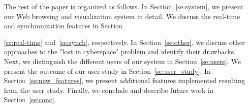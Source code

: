 \documentclass[10pt,psfig]{article}
\begin{document}
The rest of the paper is organized as follows.
In Section~\ref{se:system}, we present our Web browsing and visualization system in detail.
We discuss the real-time and synchronization features in Section~{\ref{se:real-time} and~\ref{se:synch}, respectively.
In Section~\ref{se:other}, we discuss other approaches to the "lost in cyberspace" problem and identify their drawbacks.
Next, we distinguish the different users of our system in Section~\ref{se:users}.
We present the outcome of our user study in Section~\ref{se:user_study}.
In Section~\ref{se:new_features}, we present additional features implemented resulting from the user study.
Finally, we conclude and describe future work in Section~\ref{se:conc}.



}
\end{document}
